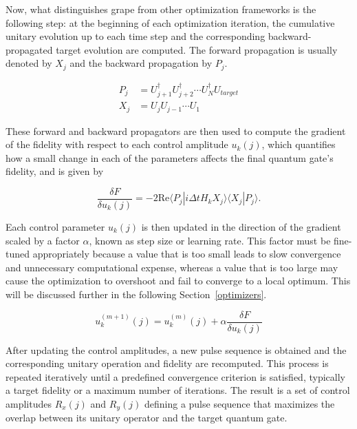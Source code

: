 Now, what distinguishes \acs{grape} from other optimization frameworks is the following step: at the beginning of each optimization iteration, the cumulative unitary evolution up to each time step and the corresponding backward-propagated target evolution are computed. The forward propagation is usually denoted by \(X_j\) and the backward propagation by \(P_j\).

\begin{equation}
\begin{aligned}
    P_j&=U_{j+1}^\dagger U_{j+2}^\dagger\cdots U_N^\dagger U_{target}\\
    X_j&=U_j U_{j-1}\cdots U_1
\end{aligned}
\end{equation}

These forward and backward propagators are then used to compute the gradient of the fidelity with respect to each control amplitude \(u_k(j)\), which quantifies how a small change in each of the parameters affects the final quantum gate's fidelity, and is given by

\begin{equation}
    \frac{\delta F}{\delta u_k(j)}=-2\mathrm{Re}\langle P_j|i\Delta t H_k X_j\rangle\langle X_j|P_j\rangle.
\end{equation}

Each control parameter \(u_k(j)\) is then updated in the direction of the gradient scaled by a factor \(\alpha\), known as step size or learning rate. This factor must be fine-tuned appropriately because a value that is too small leads to slow convergence and unnecessary computational expense, whereas a value that is too large may cause the optimization to overshoot and fail to converge to a local optimum. This will be discussed further in the following Section~\ref{optimizers}.

\begin{equation}
    u_k^{(m+1)}(j)=u_k^{(m)}(j)+\alpha\frac{\delta F}{\delta u_k(j)}
\end{equation}

After updating the control amplitudes, a new pulse sequence is obtained and the corresponding unitary operation and fidelity are recomputed. This process is repeated iteratively until a predefined convergence criterion is satisfied, typically a target fidelity or a maximum number of iterations. The result is a set of control amplitudes \(R_x(j)\) and \(R_y(j)\) defining a pulse sequence that maximizes the overlap between its unitary operator and the target quantum gate. 

